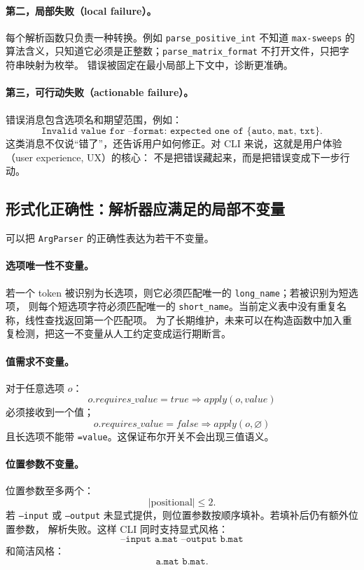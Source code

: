 \paragraph{第二，局部失败（local failure）。}
每个解析函数只负责一种转换。例如 \texttt{parse\_positive\_int} 不知道 \texttt{max-sweeps}
的算法含义，只知道它必须是正整数；\texttt{parse\_matrix\_format} 不打开文件，只把字符串映射为枚举。
错误被固定在最小局部上下文中，诊断更准确。

\paragraph{第三，可行动失败（actionable failure）。}
错误消息包含选项名和期望范围，例如：
\[
    \texttt{Invalid value for --format: expected one of \{auto, mat, txt\}.}
\]
这类消息不仅说“错了”，还告诉用户如何修正。对 CLI 来说，这就是用户体验（user experience, UX）的核心：
不是把错误藏起来，而是把错误变成下一步行动。

\subsection{形式化正确性：解析器应满足的局部不变量}

可以把 \texttt{ArgParser} 的正确性表达为若干不变量。

\paragraph{选项唯一性不变量。}
若一个 token 被识别为长选项，则它必须匹配唯一的 \texttt{long\_name}；若被识别为短选项，
则每个短选项字符必须匹配唯一的 \texttt{short\_name}。当前定义表中没有重复名称，线性查找返回第一个匹配项。
为了长期维护，未来可以在构造函数中加入重复检测，把这一不变量从人工约定变成运行期断言。

\paragraph{值需求不变量。}
对于任意选项 $o$：
\[
    o.requires\_value=true
    \Rightarrow
    apply(o,value)
\]
必须接收到一个值；
\[
    o.requires\_value=false
    \Rightarrow
    apply(o,\varnothing)
\]
且长选项不能带 \texttt{=value}。这保证布尔开关不会出现三值语义。

\paragraph{位置参数不变量。}
位置参数至多两个：
\[
    |\text{positional}|\le 2.
\]
若 \texttt{--input} 或 \texttt{--output} 未显式提供，则位置参数按顺序填补。若填补后仍有额外位置参数，
解析失败。这样 CLI 同时支持显式风格：
\[
    \texttt{--input a.mat --output b.mat}
\]
和简洁风格：
\[
    \texttt{a.mat b.mat}.
\]

